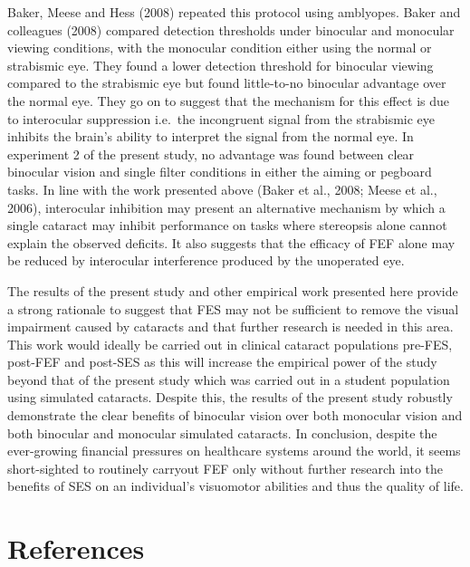 \documentclass[
  english,
  man,floatsintext]{apa6}
\begin{document}
Baker, Meese and Hess (2008) repeated this protocol using amblyopes.
Baker and colleagues (2008) compared detection thresholds under binocular and monocular viewing conditions, with the monocular condition either using the normal or strabismic eye.
They found a lower detection threshold for binocular viewing compared to the strabismic eye but found little-to-no binocular advantage over the normal eye.
They go on to suggest that the mechanism for this effect is due to interocular suppression i.e.~the incongruent signal from the strabismic eye inhibits the brain's ability to interpret the signal from the normal eye.
In experiment 2 of the present study, no advantage was found between clear binocular vision and single filter conditions in either the aiming or pegboard tasks.
In line with the work presented above (Baker et al., 2008; Meese et al., 2006), interocular inhibition may present an alternative mechanism by which a single cataract may inhibit performance on tasks where stereopsis alone cannot explain the observed deficits.
It also suggests that the efficacy of FEF alone may be reduced by interocular interference produced by the unoperated eye.

The results of the present study and other empirical work presented here provide a strong rationale to suggest that FES may not be sufficient to remove the visual impairment caused by cataracts and that further research is needed in this area.
This work would ideally be carried out in clinical cataract populations pre-FES, post-FEF and post-SES as this will increase the empirical power of the study beyond that of the present study which was carried out in a student population using simulated cataracts.
Despite this, the results of the present study robustly demonstrate the clear benefits of binocular vision over both monocular vision and both binocular and monocular simulated cataracts.
In conclusion, despite the ever-growing financial pressures on healthcare systems around the world, it seems short-sighted to routinely carryout FEF only without further research into the benefits of SES on an individual's visuomotor abilities and thus the quality of life.

\newpage

\hypertarget{references}{%
\section{References}\label{references}}

\begingroup
\setlength{\parindent}{-0.5in}
\setlength{\leftskip}{0.5in}

\hypertarget{refs}{}

\endgroup
\end{document}
